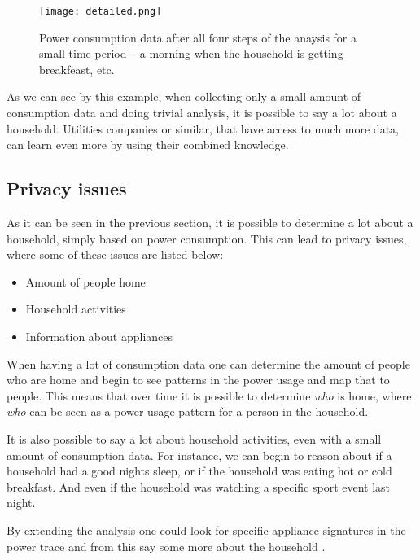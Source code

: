 \begin{figure}
  \begin{center}
    \texttt{[image: detailed.png]}
  \end{center}
  \caption{Power consumption data after all four steps of the anaysis for a small time period -- a morning when the household is getting breakfeast, etc.}
  \label{detailed_consumption}
\end{figure}

As we can see by this example, when collecting only a small amount of consumption data and doing trivial analysis, it is possible to say a lot about a household.
Utilities companies or similar, that have access to much more data, can learn even more by using their combined knowledge.

\subsection{Privacy issues}\label{privacy_concerns}
As it can be seen in the previous section, it is possible to determine a lot about a household, simply based on power consumption.
This can lead to privacy issues, where some of these issues are listed below:
\begin{itemize}
  \item Amount of people home
  \item Household activities
  \item Information about appliances
\end{itemize}

When having a lot of consumption data one can determine the amount of people who are home and begin to see patterns in the power usage and map that to people.
This means that over time it is possible to determine \textit{who} is home, where \textit{who} can be seen as a power usage pattern for a person in the household.

It is also possible to say a lot about household activities, even with a small amount of consumption data.
For instance, we can begin to reason about if a household had a good nights sleep, or if the household was eating hot or cold breakfast.
And even if the household was watching a specific sport event last night.

By extending the analysis one could look for specific appliance signatures in the power trace and from this say some more about the household \cite{NILM}.
